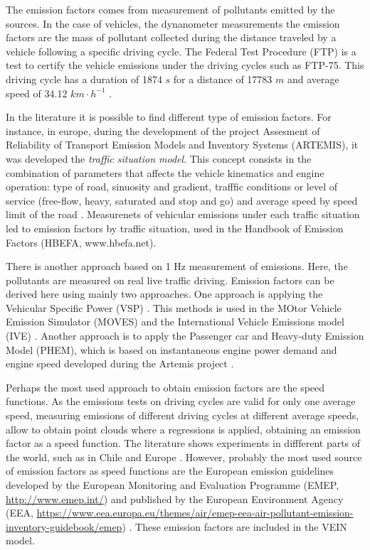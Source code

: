 \documentclass[12pt,graybox,envcountchap,sectrefs]{krantz}
\theoremstyle{definition}
\theoremstyle{definition}
\theoremstyle{definition}
\theoremstyle{remark}
\begin{document}
The emission factors comes from measurement of pollutants emitted by the
sources. In the case of vehicles, the dynanometer measurements the
emission factors are the mass of pollutant collected during the distance
traveled by a vehicle following a specific driving cycle. The Federal
Test Procedure (FTP) is a test to certify the vehicle emissions under
the driving cycles such as FTP-75. This driving cycle has a duration of
1874 \(s\) for a distance of 17783 \(m\) and average speed of 34.12
\(km \cdot h^{-1}\) \citep{tim}.

In the literature it is possible to find different type of emission
factors. For instance, in europe, during the development of the project
Assesment of Reliability of Transport Emission Models and Inventory
Systems (ARTEMIS), it was developed the \emph{traffic situation model}.
This concept consists in the combination of parameters that affects the
vehicle kinematics and engine operation: type of road, sinuosity and
gradient, trafffic conditions or level of service (free-flow, heavy,
saturated and stop and go) and average speed by speed limit of the road
\citep{artemis}. Measurenets of vehicular emissions under each traffic
situation led to emission factors by traffic situation, used in the
Handbook of Emission Factors (HBEFA, www.hbefa.net).

There is another approach based on 1 Hz measurement of emissions. Here,
the pollutants are measured on real live traffic driving. Emission
factors can be derived here using mainly two approaches. One approach is
applying the Vehicular Specific Power (VSP) \citep{jimenez1999vehicle}.
This methods is used in the MOtor Vehicle Emission Simulator (MOVES)
\citep{koupal2003design} and the International Vehicle Emissions model
(IVE) \citep{Davisetal2005}. Another approach is to apply the Passenger
car and Heavy-duty Emission Model (PHEM), which is based on
instantaneous engine power demand and engine speed developed during the
Artemis project \citep[\citet{artemis}]{tim}.

Perhaps the most used approach to obtain emission factors are the speed
functions. As the emissions tests on driving cycles are valid for only
one average speed, measuring emissions of different driving cycles at
different average speeds, allow to obtain point clouds where a
regressions is applied, obtaining an emission factor as a speed
function. The literature shows experiments in diffferent parts of the
world, such as in Chile \citep{Corvalanetal2002} and Europe
\citep{ntziachristos2000speed}. However, probably the most used source
of emission factors as speed functions are the European emission
guidelines developed by the European Monitoring and Evaluation Programme
(EMEP, \url{http://www.emep.int/}) and published by the European
Environment Agency (EEA,
\url{https://www.eea.europa.eu/themes/air/emep-eea-air-pollutant-emission-inventory-guidebook/emep})
\citep{NtziachristosSamaras2016}. These emission factors are included in
the VEIN model.
\end{document}
